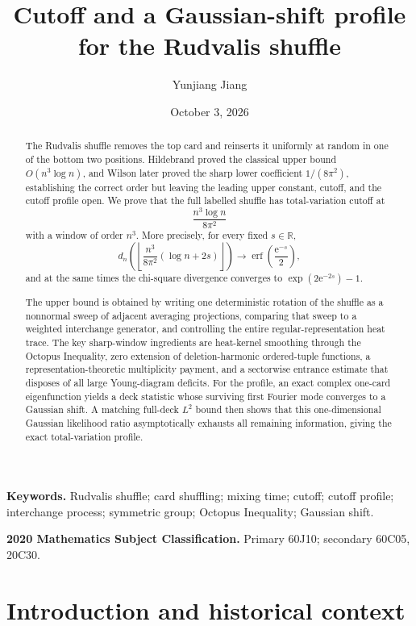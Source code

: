 \documentclass[11pt]{article}
\title{Cutoff and a Gaussian-shift profile for the Rudvalis shuffle}
\author{Yunjiang Jiang}
\date{October 3, 2026}
\theoremstyle{remark}
\newcommand{\R}{\mathbb R}
\newcommand{\erf}{\operatorname{erf}}
\newcommand{\floor}[1]{\left\lfloor #1\right\rfloor}
\newcommand{\ee}{\mathrm e}
\begin{document}
\maketitle

\begin{abstract}
The Rudvalis shuffle removes the top card and reinserts it uniformly at random in one of the bottom two positions.  Hildebrand proved the classical upper bound $O(n^3\log n)$, and Wilson later proved the sharp lower coefficient $1/(8\pi^2)$, establishing the correct order but leaving the leading upper constant, cutoff, and the cutoff profile open.  We prove that the full labelled shuffle has total-variation cutoff at
\[
  \frac{n^3\log n}{8\pi^2}
\]
with a window of order $n^3$.  More precisely, for every fixed $s\in\R$,
\[
 d_n\!\left(\floor{\frac{n^3}{8\pi^2}(\log n+2s)}\right)
 \longrightarrow
 \erf\!\left(\frac{\ee^{-s}}2\right),
\]
and at the same times the chi-square divergence converges to
$\exp(2\ee^{-2s})-1$.

The upper bound is obtained by writing one deterministic rotation of the shuffle as a nonnormal sweep of adjacent averaging projections, comparing that sweep to a weighted interchange generator, and controlling the entire regular-representation heat trace.  The key sharp-window ingredients are heat-kernel smoothing through the Octopus Inequality, zero extension of deletion-harmonic ordered-tuple functions, a representation-theoretic multiplicity payment, and a sectorwise entrance estimate that disposes of all large Young-diagram deficits.  For the profile, an exact complex one-card eigenfunction yields a deck statistic whose surviving first Fourier mode converges to a Gaussian shift.  A matching full-deck $L^2$ bound then shows that this one-dimensional Gaussian likelihood ratio asymptotically exhausts all remaining information, giving the exact total-variation profile.
\end{abstract}

\noindent\textbf{Keywords.} Rudvalis shuffle; card shuffling; mixing time; cutoff; cutoff profile; interchange process; symmetric group; Octopus Inequality; Gaussian shift.

\medskip
\noindent\textbf{2020 Mathematics Subject Classification.} Primary 60J10; secondary 60C05, 20C30.

\tableofcontents
\newpage

\section{Introduction and historical context}\label{sec:intro}
\end{document}
